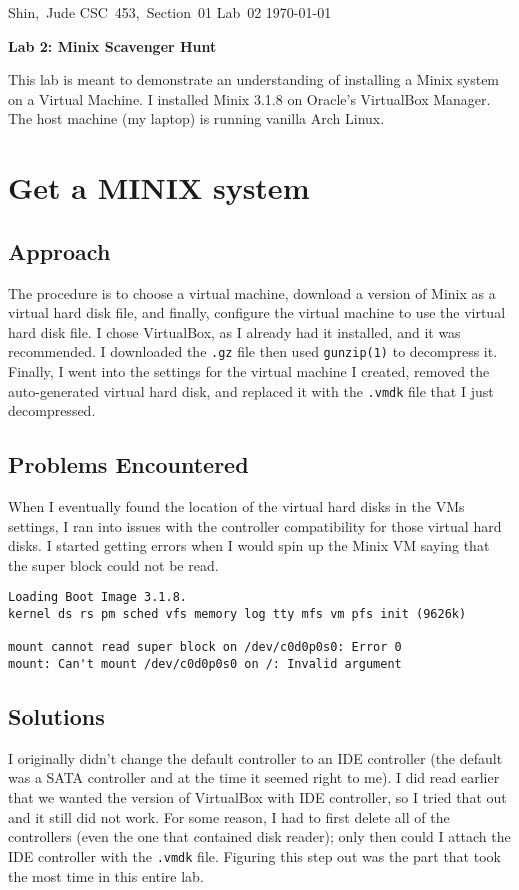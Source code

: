 \documentclass[11pt]{article}
\begin{document}
\hfill\vbox{\hbox{Shin, Jude}
		\hbox{CSC 453, Section 01}	
		\hbox{Lab 02}	
		\hbox{\today}}\par

\bigskip
\centerline{\Large\bf Lab 2: {\sc Minix} Scavenger Hunt}\par
\bigskip

This lab is meant to demonstrate an understanding of installing a {\sc Minix} system on a Virtual Machine. I installed {\sc Minix 3.1.8} on Oracle's {\sc VirtualBox Manager}. The host machine (my laptop) is running vanilla {\sc Arch Linux}.

\setcounter{section}{0}
\section{Get a MINIX system}
\subsection{Approach}
The procedure is to choose a virtual machine, download a version of {\sc Minix} as a virtual hard disk file, and finally, configure the virtual machine to use the virtual hard disk file. I chose {\sc VirtualBox}, as I already had it installed, and it was recommended. I downloaded the {\tt .gz} file then used {\tt gunzip(1)} to decompress it. Finally, I went into the settings for the virtual machine I created, removed the auto-generated virtual hard disk, and replaced it with the {\tt .vmdk} file that I just decompressed. 

\subsection{Problems Encountered}
When I eventually found the location of the virtual hard disks in the VMs settings, I ran into issues with the controller compatibility for those virtual hard disks. I started getting errors when I would spin up the {\sc Minix} VM saying that the super block could not be read. 

\begin{verbatim}
Loading Boot Image 3.1.8.
kernel ds rs pm sched vfs memory log tty mfs vm pfs init (9626k)

mount cannot read super block on /dev/c0d0p0s0: Error 0
mount: Can't mount /dev/c0d0p0s0 on /: Invalid argument
\end{verbatim}

\subsection{Solutions}
I originally didn't change the default controller to an IDE controller (the default was a SATA controller and at the time it seemed right to me). I did read earlier that we wanted the version of {\sc VirtualBox} with IDE controller, so I tried that out and it still did not work. For some reason, I had to first delete all of the controllers (even the one that contained disk reader); only then could I attach the IDE controller with the {\tt .vmdk} file. Figuring this step out was the part that took the most time in this entire lab. 
\end{document}
